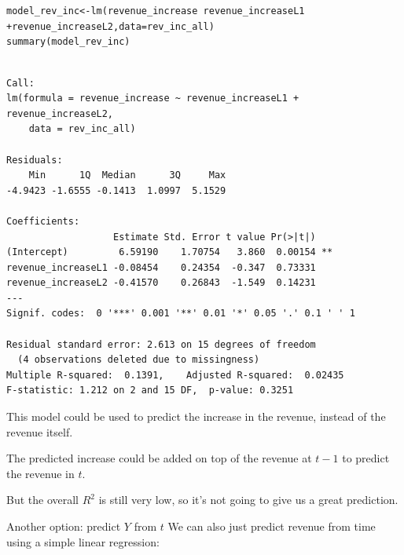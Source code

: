 \documentclass{beamer}\usepackage[]{graphicx}\usepackage[]{color}
\makeatletter
\newcommand{\hlopt}[1]{\textcolor[rgb]{1,0.894,0.769}{#1}}%
\newcommand{\hlstd}[1]{\textcolor[rgb]{1,0.894,0.769}{#1}}%
\newcommand{\hlkwb}[1]{\textcolor[rgb]{0.804,0.776,0.451}{#1}}%
\newcommand{\hlkwc}[1]{\textcolor[rgb]{0.78,0.941,0.545}{#1}}%
\newcommand{\hlkwd}[1]{\textcolor[rgb]{1,0.78,0.769}{#1}}%
\newenvironment{kframe}{%
 \def\at@end@of@kframe{}%
 \ifinner\ifhmode%
  \def\at@end@of@kframe{\end{minipage}}%
  \begin{minipage}{\columnwidth}%
 \fi\fi%
 \def\FrameCommand##1{\hskip\@totalleftmargin \hskip-\fboxsep
 \colorbox{shadecolor}{##1}\hskip-\fboxsep
     \hskip-\linewidth \hskip-\@totalleftmargin \hskip\columnwidth}%
 \MakeFramed {\advance\hsize-\width
   \@totalleftmargin\z@ \linewidth\hsize
   \@setminipage}}%
 {\par\unskip\endMakeFramed%
 \at@end@of@kframe}
\newenvironment{knitrout}{}{} %
\makeatother
\begin{document}
\begin{darkframes}
     
     \begin{frame}[fragile]
     \fontsize{8}{8}\selectfont
\begin{knitrout}
\begin{kframe}
\begin{alltt}
\hlstd{model_rev_inc} \hlkwb{<-} \hlkwd{lm}\hlstd{(revenue_increase} \hlopt{~} \hlstd{revenue_increaseL1}
                      \hlopt{+} \hlstd{revenue_increaseL2,} \hlkwc{data}\hlstd{=rev_inc_all)}
\hlkwd{summary}\hlstd{(model_rev_inc)}
\end{alltt}
\begin{verbatim}

Call:
lm(formula = revenue_increase ~ revenue_increaseL1 + revenue_increaseL2, 
    data = rev_inc_all)

Residuals:
    Min      1Q  Median      3Q     Max 
-4.9423 -1.6555 -0.1413  1.0997  5.1529 

Coefficients:
                   Estimate Std. Error t value Pr(>|t|)   
(Intercept)         6.59190    1.70754   3.860  0.00154 **
revenue_increaseL1 -0.08454    0.24354  -0.347  0.73331   
revenue_increaseL2 -0.41570    0.26843  -1.549  0.14231   
---
Signif. codes:  0 '***' 0.001 '**' 0.01 '*' 0.05 '.' 0.1 ' ' 1

Residual standard error: 2.613 on 15 degrees of freedom
  (4 observations deleted due to missingness)
Multiple R-squared:  0.1391,	Adjusted R-squared:  0.02435 
F-statistic: 1.212 on 2 and 15 DF,  p-value: 0.3251
\end{verbatim}
\end{kframe}
\end{knitrout}
     \end{frame}
    
    
    \begin{frame}[fragile]
      This model could be used to predict the increase in the revenue, instead of the revenue itself.
      \bigskip
      
      The predicted increase could be added on top of the revenue at $t-1$ to predict the revenue in $t$.
      \bigskip
      
      But the overall $R^2$ is still very low, so it's not going to give us a great prediction.
    \end{frame}

    \begin{frame}[fragile]{Another option: predict $Y$ from $t$}
     \fontsize{8}{8}\selectfont
      We can also just predict revenue from time using a simple linear regression:
\begin{knitrout}
\begin{kframe}
\begin{verbatim}


\end{verbatim}
\end{kframe}
\end{knitrout}
\end{frame}
\end{darkframes}
\end{document}

